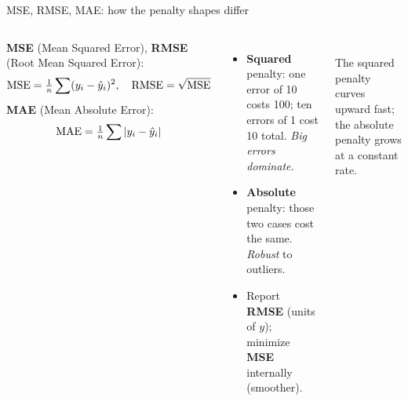 \documentclass[aspectratio=169]{beamer}
\begin{document}
\begin{frame}{MSE, RMSE, MAE: how the penalty shapes differ}
  \begin{columns}[T]
    \small
    \textbf{MSE} (Mean Squared Error), \textbf{RMSE} (Root Mean Squared Error):
    \[ \text{MSE} = \tfrac{1}{n}\sum (y_i-\hat{y}_i)^2,\quad \text{RMSE}=\sqrt{\text{MSE}} \]
    \textbf{MAE} (Mean Absolute Error):
    \[ \text{MAE} = \tfrac{1}{n}\sum |y_i-\hat{y}_i| \]
    \begin{itemize}
      \item \textbf{Squared} penalty: one error of 10 costs 100; ten errors of 1 cost 10 total. \emph{Big errors dominate.}
      \item \textbf{Absolute} penalty: those two cases cost the same. \emph{Robust} to outliers.
      \item Report \textbf{RMSE} (units of $y$); minimize \textbf{MSE} internally (smoother).
    \end{itemize}
    \begin{center}
      \\[2pt]
      \scriptsize The squared penalty curves upward fast; the absolute penalty grows at a constant rate.
    \end{center}
  \end{columns}
\end{frame}
\end{document}
